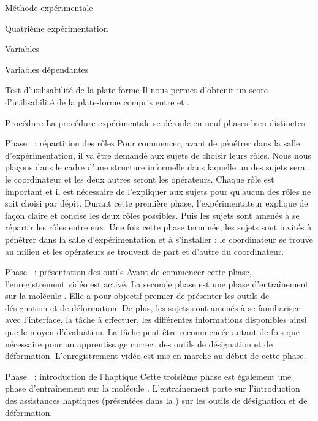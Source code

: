 \documentclass[myfrancais,ngerman,english,frenchb]{mythesis}
\begin{document}
\begin{mychapter}{Méthode expérimentale}
\begin{mysection}{Quatrième expérimentation}
\begin{mysubsection}{Variables}
\begin{mysubsubsection}{Variables dépendantes}
\begin{myparagraph}{ Test d'utilisabilité de la plate-forme}
						Il nous permet d'obtenir un score d'utilisabilité de la plate-forme compris entre  et .
					\end{myparagraph}
				\end{mysubsubsection}
			\end{mysubsection}
			\begin{mysubsection}{Procédure}
				La procédure expérimentale se déroule en neuf phases bien distinctes.
				\begin{myparagraph}{Phase~ : répartition des rôles}
					Pour commencer, avant de pénétrer dans la salle d'expérimentation, il va être demandé aux sujets de choisir leurs rôles.
					Nous nous plaçons dans le cadre d'une structure informelle dans laquelle un des sujets sera le coordinateur et les deux autres seront les opérateurs.
					Chaque rôle est important et il est nécessaire de l'expliquer aux sujets pour qu'aucun des rôles ne soit choisi par dépit.
					Durant cette première phase, l'expérimentateur explique de façon claire et concise les deux rôles possibles.
					Puis les sujets sont amenés à se répartir les rôles entre eux.
					Une fois cette phase terminée, les sujets sont invités à pénétrer dans la salle d'expérimentation et à s'installer : le coordinateur se trouve au milieu et les opérateurs se trouvent de part et d'autre du coordinateur.
				\end{myparagraph}
				\begin{myparagraph}{Phase~ : présentation des outils}
					Avant de commencer cette phase, l'enregistrement vidéo est activé.
					La seconde phase est une phase d'entraînement sur la molécule \myTRPCAGE.
					Elle a pour objectif premier de présenter les outils de désignation et de déformation.
					De plus, les sujets sont amenés à se familiariser avec l'interface, la tâche à effectuer, les différentes informations disponibles ainsi que le moyen d'évaluation.
					La tâche peut être recommencée autant de fois que nécessaire pour un apprentissage correct des outils de désignation et de déformation.
					L'enregistrement vidéo est mis en marche au début de cette phase.
				\end{myparagraph}
				\begin{myparagraph}{Phase~ : introduction de l'haptique}
					Cette troisième phase est également une phase d'entraînement sur la molécule \myPrion.
					L'entraînement porte sur l'introduction des assistances haptiques (présentées dans la ) sur les outils de désignation et de déformation.

\end{myparagraph}
\end{mysubsection}
\end{mysection}
\end{mychapter}
\end{document}
